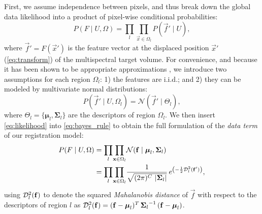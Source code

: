 First, we assume independence between pixels, and thus break down the
  global data likelihood into a product of pixel-wise conditional probabilities:
  \begin{equation}
  P(F \mid U,\Omega) = \underset{l}{\prod} \underset{\vec{x}\in \Omega_l}{\prod}
    P\left( \vec{f}' \mid U \right),
  \label{eq:bayes_aposteriori}
  \end{equation}
  where $\vec{f}' = F(\vec{x}')$ is the feature vector at the displaced
  position $\vec{x}'$ (\autoref{eq:transform}) of the multispectral target
  volume.
For convenience, and because it has been shown to be appropriate approximations
  \citep{cuadra_comparison_2005}, we introduce two assumptions for each
  region $\Omega_l$:
  1) the features are i.i.d.; and 2) they can be modeled by multivariate normal
  distributions:
  \begin{equation}
  P\left( \vec{f}' \mid U,\Omega_l \right) = \mathcal{N} \left( \vec{f}' \mid \Theta_l \right),
  \label{eq:likelihood}
  \end{equation}
 	where $\Theta_l = \lbrace \boldsymbol{\mu}_l, \boldsymbol{\Sigma}_{l} \rbrace$ are the
 	descriptors of region $\Omega_l$.
We then insert \autoref{eq:likelihood} into \autoref{eq:bayes_rule} to obtain the full
  formulation of the \emph{data term} of our registration model:
 	\begin{align}
  P( F \mid U, \Omega ) &= \underset{l}{\prod} \underset{\vec{x} \in \Omega_l}{\prod}
  \mathcal{N} ( \vec{f} \mid \boldsymbol{\mu}_l, \boldsymbol{\Sigma}_{l} ) \notag\\
  &= \underset{l}{\prod} \underset{\vec{x} \in \Omega_l}{\prod} \frac{1}{ \sqrt{(2\pi)^{C}\,\left|\boldsymbol{\Sigma}_{l}\right|}}\,{e^{\left(-\frac{1}{2}
  \mdist{f'}{l} \right)}},
  \label{eq:pdf}
  \end{align}
  using $\mdist{f}{l}$ to denote the squared \emph{Mahalanobis distance} of $\vec{f}$ with respect
  to the descriptors of region $l$ as
  $\mdist{f}{l} = (\vec{f} - \boldsymbol{\mu}_l)^T \, {\boldsymbol{\Sigma}_l}^{-1} \, (\vec{f} - \boldsymbol{\mu}_l)$.


